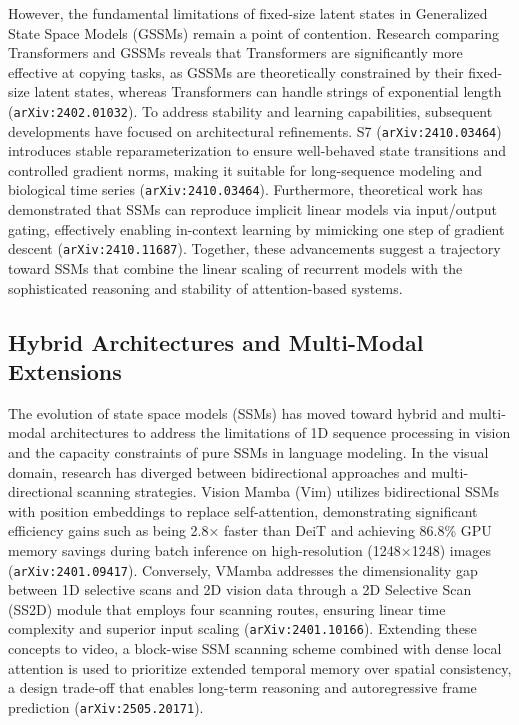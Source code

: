 \documentclass[11pt]{article}
\begin{document}
However, the fundamental limitations of fixed-size latent states in Generalized State Space Models (GSSMs) remain a point of contention. Research comparing Transformers and GSSMs reveals that Transformers are significantly more effective at copying tasks, as GSSMs are theoretically constrained by their fixed-size latent states, whereas Transformers can handle strings of exponential length (\texttt{arXiv:2402.01032}). To address stability and learning capabilities, subsequent developments have focused on architectural refinements. S7 (\texttt{arXiv:2410.03464}) introduces stable reparameterization to ensure well-behaved state transitions and controlled gradient norms, making it suitable for long-sequence modeling and biological time series (\texttt{arXiv:2410.03464}). Furthermore, theoretical work has demonstrated that SSMs can reproduce implicit linear models via input/output gating, effectively enabling in-context learning by mimicking one step of gradient descent (\texttt{arXiv:2410.11687}). Together, these advancements suggest a trajectory toward SSMs that combine the linear scaling of recurrent models with the sophisticated reasoning and stability of attention-based systems.

\subsection{Hybrid Architectures and Multi-Modal Extensions}

The evolution of state space models (SSMs) has moved toward hybrid and multi-modal architectures to address the limitations of 1D sequence processing in vision and the capacity constraints of pure SSMs in language modeling. In the visual domain, research has diverged between bidirectional approaches and multi-directional scanning strategies. Vision Mamba (Vim) utilizes bidirectional SSMs with position embeddings to replace self-attention, demonstrating significant efficiency gains such as being 2.8× faster than DeiT and achieving 86.8\% GPU memory savings during batch inference on high-resolution (1248×1248) images (\texttt{arXiv:2401.09417}). Conversely, VMamba addresses the dimensionality gap between 1D selective scans and 2D vision data through a 2D Selective Scan (SS2D) module that employs four scanning routes, ensuring linear time complexity and superior input scaling (\texttt{arXiv:2401.10166}). Extending these concepts to video, a block-wise SSM scanning scheme combined with dense local attention is used to prioritize extended temporal memory over spatial consistency, a design trade-off that enables long-term reasoning and autoregressive frame prediction (\texttt{arXiv:2505.20171}).
\end{document}
